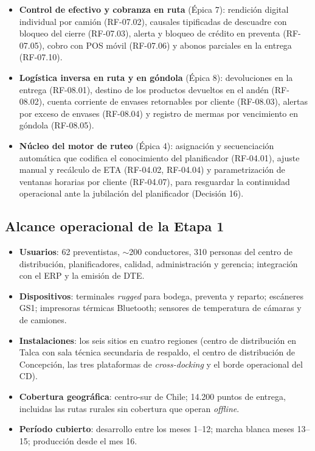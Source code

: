 \begin{itemize}
  \item \textbf{Control de efectivo y cobranza en ruta} (Épica 7): rendición digital individual por camión (RF-07.02), causales tipificadas de descuadre con bloqueo del cierre (RF-07.03), alerta y bloqueo de crédito en preventa (RF-07.05), cobro con POS móvil (RF-07.06) y abonos parciales en la entrega (RF-07.10).
  \item \textbf{Logística inversa en ruta y en góndola} (Épica 8): devoluciones en la entrega (RF-08.01), destino de los productos devueltos en el andén (RF-08.02), cuenta corriente de envases retornables por cliente (RF-08.03), alertas por exceso de envases (RF-08.04) y registro de mermas por vencimiento en góndola (RF-08.05).
  \item \textbf{Núcleo del motor de ruteo} (Épica 4): asignación y secuenciación automática que codifica el conocimiento del planificador (RF-04.01), ajuste manual y recálculo de ETA (RF-04.02, RF-04.04) y parametrización de ventanas horarias por cliente (RF-04.07), para resguardar la continuidad operacional ante la jubilación del planificador (Decisión 16).
\end{itemize}

\subsection{Alcance operacional de la Etapa 1}

\begin{itemize}
  \item \textbf{Usuarios}: 62 preventistas, $\sim$200 conductores, 310 personas del centro de distribución, planificadores, calidad, administración y gerencia; integración con el ERP y la emisión de DTE.
  \item \textbf{Dispositivos}: terminales \emph{rugged} para bodega, preventa y reparto; escáneres GS1; impresoras térmicas Bluetooth; sensores de temperatura de cámaras y de camiones.
  \item \textbf{Instalaciones}: los seis sitios en cuatro regiones (centro de distribución en Talca con sala técnica secundaria de respaldo, el centro de distribución de Concepción, las tres plataformas de \emph{cross-docking} y el borde operacional del CD).
  \item \textbf{Cobertura geográfica}: centro-sur de Chile; 14.200 puntos de entrega, incluidas las rutas rurales sin cobertura que operan \emph{offline}.
  \item \textbf{Período cubierto}: desarrollo entre los meses 1--12; marcha blanca meses 13--15; producción desde el mes 16.
\end{itemize}

